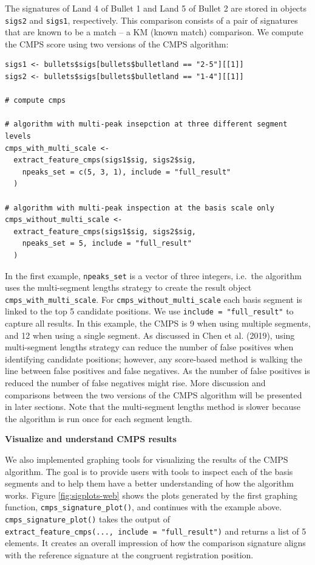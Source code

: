 The signatures of Land 4 of Bullet 1 and Land 5 of Bullet 2 are stored in objects \texttt{sigs2} and \texttt{sigs1}, respectively.
This comparison consists of a pair of signatures that are known to be a match -- a KM (known match) comparison.
We compute the CMPS score using two versions of the CMPS algorithm:

\begin{verbatim}
sigs1 <- bullets$sigs[bullets$bulletland == "2-5"][[1]]
sigs2 <- bullets$sigs[bullets$bulletland == "1-4"][[1]]

# compute cmps

# algorithm with multi-peak insepction at three different segment levels
cmps_with_multi_scale <-
  extract_feature_cmps(sigs1$sig, sigs2$sig,
    npeaks_set = c(5, 3, 1), include = "full_result"
  )

# algorithm with multi-peak inspection at the basis scale only
cmps_without_multi_scale <-
  extract_feature_cmps(sigs1$sig, sigs2$sig,
    npeaks_set = 5, include = "full_result"
  )
\end{verbatim}

In the first example, \texttt{npeaks\_set} is a vector of three integers, i.e.~the algorithm uses the multi-segment lengths strategy to create the result object \texttt{cmps\_with\_multi\_scale}.
For \texttt{cmps\_without\_multi\_scale} each basis segment is linked to the top 5 candidate positions.
We use \texttt{include\ =\ "full\_result"} to capture all results.
In this example, the CMPS is 9 when using multiple segments, and 12 when using a single segment.
As discussed in Chen et al. (2019), using multi-segment lengths strategy can reduce the number of false positives when identifying candidate positions; however, any score-based method is walking the line between false positives and false negatives.
As the number of false positives is reduced the number of false negatives might rise.
More discussion and comparisons between the two versions of the CMPS algorithm will be presented in later sections.
Note that the multi-segment lengths method is slower because the algorithm is run once for each segment length.

\textbf{Visualize and understand CMPS results}

We also implemented graphing tools for visualizing the results of the CMPS algorithm.
The goal is to provide users with tools to inspect each of the basis segments and to help them have a better understanding of how the algorithm works.
Figure \ref{fig:sigplots-web} shows the plots generated by the first graphing function, \texttt{cmps\_signature\_plot()}, and continues with the example above.
\texttt{cmps\_signature\_plot()} takes the output of \texttt{extract\_feature\_cmps(...,\ include\ =\ "full\_result")} and returns a list of 5 elements.
It creates an overall impression of how the comparison signature aligns with the reference signature at the congruent registration position.

